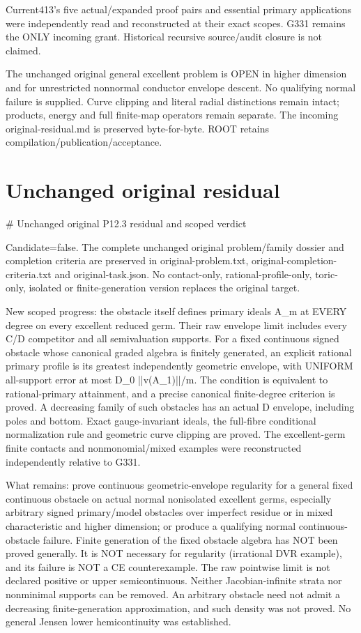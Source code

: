 \documentclass[11pt]{article}
\begin{document}
Current413's five actual/expanded proof pairs and essential primary applications were independently read and reconstructed at their exact scopes. G331 remains the ONLY incoming grant. Historical recursive source/audit closure is not claimed.

The unchanged original general excellent problem is OPEN in higher dimension and for unrestricted nonnormal conductor envelope descent. No qualifying normal failure is supplied. Curve clipping and literal radial distinctions remain intact; products, energy and full finite-map operators remain separate. The incoming original-residual.md is preserved byte-for-byte. ROOT retains compilation/publication/acceptance.


\section*{Unchanged original residual}
\# Unchanged original P12.3 residual and scoped verdict

Candidate=false. The complete unchanged original problem/family dossier and completion criteria are preserved in original-problem.txt, original-completion-criteria.txt and original-task.json. No contact-only, rational-profile-only, toric-only, isolated or finite-generation version replaces the original target.

New scoped progress: the obstacle itself defines primary ideals A\_m at EVERY degree on every excellent reduced germ. Their raw envelope limit includes every C/D competitor and all semivaluation supports. For a fixed continuous signed obstacle whose canonical graded algebra is finitely generated, an explicit rational primary profile is its greatest independently geometric envelope, with UNIFORM all-support error at most D\_0 ||v(A\_1)||/m. The condition is equivalent to rational-primary attainment, and a precise canonical finite-degree criterion is proved. A decreasing family of such obstacles has an actual D envelope, including poles and bottom. Exact gauge-invariant ideals, the full-fibre conditional normalization rule and geometric curve clipping are proved. The excellent-germ finite contacts and nonmonomial/mixed examples were reconstructed independently relative to G331.

What remains: prove continuous geometric-envelope regularity for a general fixed continuous obstacle on actual normal nonisolated excellent germs, especially arbitrary signed primary/model obstacles over imperfect residue or in mixed characteristic and higher dimension; or produce a qualifying normal continuous-obstacle failure. Finite generation of the fixed obstacle algebra has NOT been proved generally. It is NOT necessary for regularity (irrational DVR example), and its failure is NOT a CE counterexample. The raw pointwise limit is not declared positive or upper semicontinuous. Neither Jacobian-infinite strata nor nonminimal supports can be removed. An arbitrary obstacle need not admit a decreasing finite-generation approximation, and such density was not proved. No general Jensen lower hemicontinuity was established.
\end{document}
